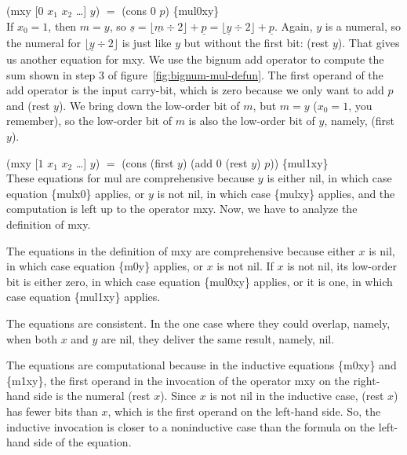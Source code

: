 \vspace{2mm}\hspace*{2cm} \textsf{(mxy [$0$ $x_1$ $x_2$ \dots] $y$)} $=$ \textsf{(cons $0$ $p$)} \hfill \{mul0xy\}\\

If $x_0 = 1$, then $m = y$,
so $\underline{s} = \lfloor \underline{m}\div 2\rfloor + \underline{p} = \lfloor \underline{y}\div 2\rfloor + \underline{p}$.
Again, $y$ is a numeral, so the numeral for $\lfloor \underline{y}\div 2\rfloor$
is just like $y$ but without the first bit: (\textsf{rest} $y$).
That gives us another equation for \textsf{mxy}.
We use the bignum \textsf{add} operator to compute the sum
shown in step 3 of figure~\ref{fig:bignum-mul-defun}.
The first operand of the \textsf{add} operator is the input carry-bit,
which is zero because we only want to add $p$ and \textsf{(rest $y$)}.
We bring down the low-order bit of $m$, but $m = y$
($x_0 = 1$, you remember), so the low-order bit of $m$
is also the low-order bit of $y$, namely, \textsf{(first $y$)}.

\vspace{2mm}\hspace*{2cm} \textsf{(mxy [$1$ $x_1$ $x_2$ \dots] $y$)} $=$ \textsf{(cons (first $y$) (add 0 (rest $y$) $p$))} \hfill \{mul1xy\}\\

These equations for \textsf{mul} are comprehensive because $y$ is either \textsf{nil},
in which case equation \{mulx0\} applies,
or $y$ is not \textsf{nil}, in which case \{mulxy\} applies, and
the computation is left up to the operator \textsf{mxy}.
Now, we have to analyze the definition of \textsf{mxy}.

The equations in the definition of \textsf{mxy} are comprehensive
because either $x$ is \textsf{nil}, in which case
equation \{m0y\} applies, or $x$ is not \textsf{nil}.
If $x$ is not \textsf{nil}, its low-order bit is either zero,
in which case equation \{mul0xy\} applies, or it is one,
in which case equation \{mul1xy\} applies.

The equations are consistent. In the one case
where they could overlap, namely, when both $x$ and $y$
are \textsf{nil}, they deliver the same result, namely, \textsf{nil}.

The equations are computational because in the inductive equations
\{m0xy\} and \{m1xy\}, the first operand in
the invocation of the operator \textsf{mxy} on the right-hand side
is the numeral \textsf{(rest $x$)}.
Since $x$ is not \textsf{nil} in the inductive case,
\textsf{(rest $x$)} has fewer bits than $x$, which is the first operand
on the left-hand side.
So, the inductive invocation is closer to a noninductive
case than the formula on the left-hand side of the equation.

